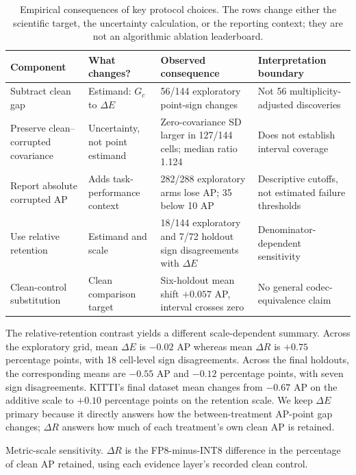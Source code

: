 \documentclass[a4paper,fleqn]{cas-dc}
\begin{document}
\begin{table}[t]
\centering\small
\caption{Empirical consequences of key protocol choices. The rows change either the scientific target, the uncertainty calculation, or the reporting context; they are not an algorithmic ablation leaderboard.}
\label{tab:components}
\setlength{\tabcolsep}{4pt}
\begin{tabular}{Y{2.7cm}Y{2.7cm}Y{4.5cm}Y{4.3cm}}
\toprule
Component & What changes? & Observed consequence & Interpretation boundary\\
\midrule
Subtract clean gap & Estimand: $G_c$ to $\Delta E$ & 56/144 exploratory point-sign changes & Not 56 multiplicity-adjusted discoveries\\
Preserve clean--corrupted covariance & Uncertainty, not point estimand & Zero-covariance SD larger in 127/144 cells; median ratio 1.124 & Does not establish interval coverage\\
Report absolute corrupted AP & Adds task-performance context & 282/288 exploratory arms lose AP; 35 below 10 AP & Descriptive cutoffs, not estimated failure thresholds\\
Use relative retention & Estimand and scale & 18/144 exploratory and 7/72 holdout sign disagreements with $\Delta E$ & Denominator-dependent sensitivity\\
Clean-control substitution & Clean comparison target & Six-holdout mean shift $+0.057$ AP, interval crosses zero & No general codec-equivalence claim\\
\bottomrule
\end{tabular}
\end{table}

The relative-retention contrast yields a different scale-dependent summary. Across the exploratory grid, mean $\Delta E$ is $-0.02$ AP whereas mean $\Delta R$ is $+0.75$ percentage points, with 18 cell-level sign disagreements. Across the final holdouts, the corresponding means are $-0.55$ AP and $-0.12$ percentage points, with seven sign disagreements. KITTI's final dataset mean changes from $-0.67$ AP on the additive scale to $+0.10$ percentage points on the retention scale. We keep $\Delta E$ primary because it directly answers how the between-treatment AP-point gap changes; $\Delta R$ answers how much of each treatment's own clean AP is retained.

\begin{table}[t]
\centering
\caption{Metric-scale sensitivity. $\Delta R$ is the FP8-minus-INT8 difference in the percentage of clean AP retained, using each evidence layer's recorded clean control.}
\label{tab:relative-retention}
\small
\setlength{\tabcolsep}{6pt}

\end{table}
\end{document}

